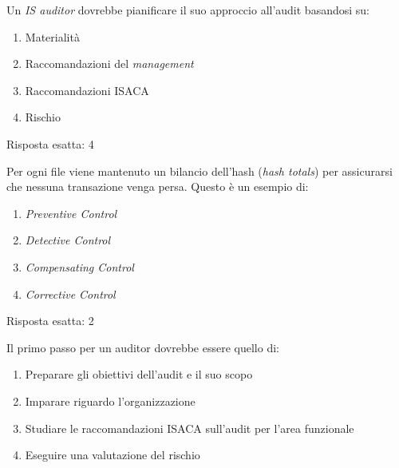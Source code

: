 \begin{Exercise} [
  title={Quiz},
  label={audit3}
  ]

  \Question Un \textit{IS auditor} dovrebbe pianificare il suo approccio 
all'audit basandosi su:
\begin{enumerate}
 \item Materialità
 \item Raccomandazioni del \textit{management}
 \item Raccomandazioni ISACA
 \item Rischio
\end{enumerate}
  
\end{Exercise}


\begin{Answer} [
  ref={audit3},
  number={3}
  ]

  \Question Risposta esatta: 4

\end{Answer}

\begin{Exercise} [
  title={Quiz},
  label={audit4}
  ]

  \Question Per ogni file viene mantenuto un bilancio dell'hash 
  (\textit{hash totals}) per assicurarsi che nessuna transazione venga
  persa. Questo è un esempio di:
  
\begin{enumerate}
 \item \textit{Preventive Control}
 \item \textit{Detective Control}
 \item \textit{Compensating Control}
 \item \textit{Corrective Control}
\end{enumerate}

\end{Exercise}


\begin{Answer} [
  ref={audit4},
  number={4}
  ]

  \Question Risposta esatta: 2

\end{Answer}

\begin{Exercise} [
  title={Quiz},
  label={audit5}
  ]

  \Question Il primo passo per un auditor dovrebbe essere quello di:
  \begin{enumerate}
   \item Preparare gli obiettivi dell'audit e il suo scopo
   \item Imparare riguardo l'organizzazione
   \item Studiare le raccomandazioni ISACA sull'audit per l'area funzionale
   \item Eseguire una valutazione del rischio
  \end{enumerate}

\end{Exercise}


